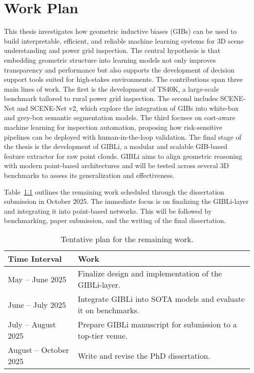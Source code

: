 
%

\chapter{Work Plan}\label{cha:work_plan}

This thesis investigates how geometric inductive biases (GIBs) can be used to
build interpretable, efficient, and reliable machine learning systems for 3D
scene understanding and power grid inspection. The central hypothesis is that
embedding geometric structure into learning models not only improves
transparency and performance but also supports the development of decision
support tools suited for high-stakes environments.
%
The contributions span three main lines of work. The first is the development
of TS40K, a large-scale benchmark tailored to rural power grid inspection. The
second includes SCENE-Net and SCENE-Net v2, which explore the integration of
GIBs into white-box and grey-box semantic segmentation models. The third
focuses on cost-aware machine learning for inspection automation, proposing how
risk-sensitive pipelines can be deployed with human-in-the-loop validation.
%
The final stage of the thesis is the development of GIBLi, a modular and
scalable GIB-based feature extractor for raw point clouds. GIBLi aims to align
geometric reasoning with modern point-based architectures and will be tested
across several 3D benchmarks to assess its generalization and effectiveness.

Table~\ref{tab:workplan} outlines the remaining work scheduled through the
dissertation submission in October 2025. The immediate focus is on finalizing
the GIBLi-layer and integrating it into point-based networks. This will be
followed by benchmarking, paper submission, and the writing of the final
dissertation.

\begin{table}[h]
    \centering
    \begin{tabular}{lp{}}
        \hline
        \textbf{Time Interval} & \textbf{Work}                                                                          \\ \hline
        May – June 2025        & Finalize design and implementation of the GIBLi-layer.             \\ \hline
        June – July 2025       & Integrate GIBLi into SOTA models and evaluate it on benchmarks. \\ \hline
        July – August 2025     & Prepare GIBLi manuscript for submission to a top-tier venue.   \\ \hline
        August – October 2025  & Write and revise the PhD dissertation. \\ \hline
    \end{tabular}
    \caption{Tentative plan for the remaining work.}
    \label{tab:workplan}
\end{table}
